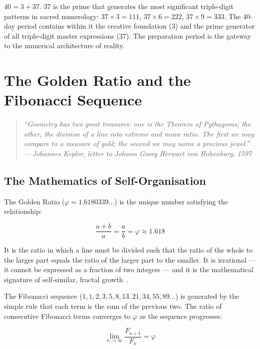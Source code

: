 \documentclass[12pt, a4paper]{article}
\newcommand{\epigraph}[2]{%
  \begin{quote}
    \itshape ``#1''\\[0.3em]
    \normalfont\small\hfill ---\,#2
  \end{quote}
}
\begin{document}
$40 = 3 + 37$. 37 is the prime that generates the most significant
triple-digit patterns in sacred numerology: $37 \times 3 = 111$,
$37 \times 6 = 222$, $37 \times 9 = 333$. The 40-day period contains within
it the creative foundation (3) and the prime generator of all triple-digit
master expressions (37). The preparation period is the gateway to the
numerical architecture of reality.

\section{The Golden Ratio and the Fibonacci Sequence}
\label{sec:golden}

\epigraph{Geometry has two great treasures: one is the Theorem of Pythagoras;
the other, the division of a line into extreme and mean ratio. The first we
may compare to a measure of gold; the second we may name a precious
jewel.}{Johannes Kepler, letter to Johann Georg Herwart von Hohenburg, 1597}

\subsection{The Mathematics of Self-Organisation}

The Golden Ratio ($\varphi = 1.6180339\ldots$) is the unique number satisfying
the relationship:

\begin{equation}
\frac{a + b}{a} = \frac{a}{b} = \varphi \approx 1.618
\end{equation}

It is the ratio in which a line must be divided such that the ratio of the
whole to the larger part equals the ratio of the larger part to the smaller.
It is irrational — it cannot be expressed as a fraction of two integers — and
it is the mathematical signature of self-similar, fractal
growth~\autocite{livio2002}.

The Fibonacci sequence ($1, 1, 2, 3, 5, 8, 13, 21, 34, 55, 89\ldots$) is
generated by the simple rule that each term is the sum of the previous two.
The ratio of consecutive Fibonacci terms converges to $\varphi$ as the sequence
progresses:

\begin{equation}
\lim_{n \to \infty} \frac{F_{n+1}}{F_n} = \varphi
\end{equation}
\end{document}
